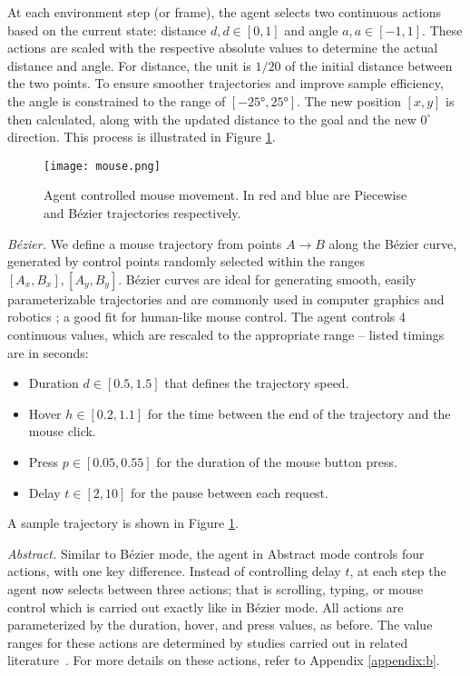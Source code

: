 At each environment step (or frame), the agent selects two continuous actions based on the current state: distance $d, d \in [0,1]$ and angle $a, a \in [-1,1]$.
These actions are scaled with the respective absolute values to determine the actual distance and angle.
For distance, the unit is $1/20$ of the initial distance between the two points.
To ensure smoother trajectories and improve sample efficiency, the angle is constrained to the range of $[\ang{-25}, \ang{25}]$.
The new position $[x,y]$ is then calculated, along with the updated distance to the goal and the new $0^{\circ}$ direction.
This process is illustrated in Figure \ref{mouse}.

\begin{figure}
\centerline{\texttt{[image: mouse.png]}}
\caption[Agent controlled mouse movement.]{Agent controlled mouse movement. In red and blue are Piecewise and Bézier trajectories respectively.}
\label{mouse}
\end{figure}

\emph{Bézier.} We define a mouse trajectory from points $A \rightarrow B$ along the Bézier curve, generated by control points randomly selected within the ranges  $[A_x,B_x], [A_y,B_y]$.
Bézier curves are ideal for generating smooth, easily parameterizable trajectories and are commonly used in computer graphics and robotics \cite{tharwat2019intelligent, wang2020using}; a good fit for human-like mouse control.
The agent controls 4 continuous values, which are rescaled to the appropriate range -- listed timings are in seconds:
\begin{itemize}
  \item Duration $d \in [0.5,1.5]$ that defines the trajectory speed.
  \item Hover $h \in [0.2,1.1]$ for the time between the end of the trajectory and the mouse click.
  \item Press $p \in [0.05,0.55]$ for the duration of the mouse button press.
  \item Delay $t \in [2,10]$ for the pause between each request.
\end{itemize}
A sample trajectory is shown in Figure \ref{mouse}.

\emph{Abstract.} Similar to Bézier mode, the agent in Abstract mode controls four actions, with one key difference.
Instead of controlling delay $t$, at each step the agent now selects between three actions; that is scrolling, typing, or mouse control which is carried out exactly like in Bézier mode.
All actions are parameterized by the duration, hover, and press values, as before.
The value ranges for these actions are determined by studies carried out in related literature~\cite{dhakal2018observations, katerina2018mouse}.
For more details on these actions, refer to Appendix \ref{appendix:b}.

